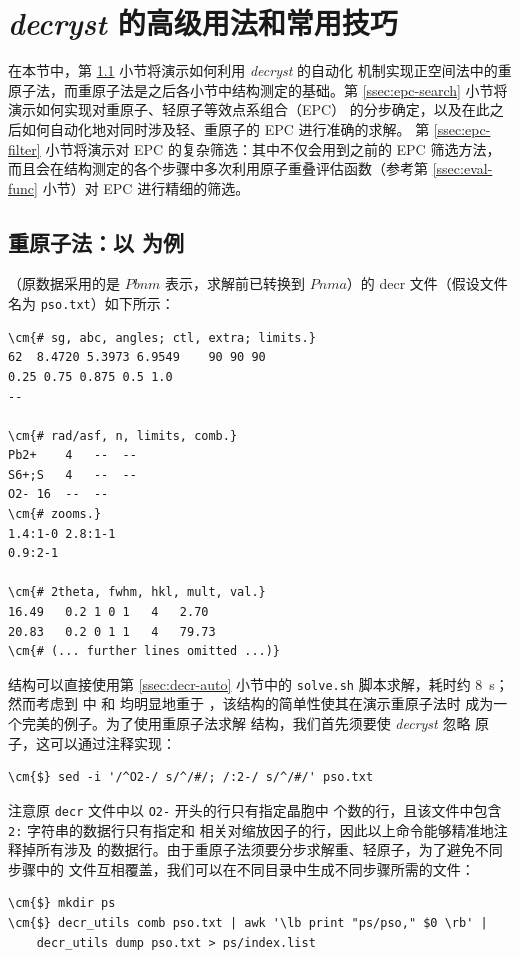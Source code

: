\section{\emph{decryst} 的高级用法和常用技巧}\label{sec:decr-adv}

在本节中，第 \ref{ssec:heavy-atom} 小节将演示如何利用 \emph{decryst} 的自动化
机制实现正空间法中的重原子法，而重原子法是之后各小节中结构测定的基础。第
\ref{ssec:epc-search} 小节将演示如何实现对重原子、轻原子等效点系组合（EPC）
的分步确定，以及在此之后如何自动化地对同时涉及轻、重原子的 EPC 进行准确的求解。
第 \ref{ssec:epc-filter} 小节将演示对 EPC 的复杂筛选：其中不仅会用到之前的
EPC 筛选方法，而且会在结构测定的各个步骤中多次利用原子重叠评估函数（参考第
\ref{ssec:eval-func} 小节）对 EPC 进行精细的筛选。

\subsection{重原子法：以  为例}\label{ssec:heavy-atom}

（原数据采用的是 $Pbnm$ 表示，求解前已转换到 $Pnma$）的
decr 文件（假设文件名为 \verb|pso.txt|）如下所示：
\begin{Verbatim}
\cm{# sg, abc, angles; ctl, extra; limits.}
62	8.4720 5.3973 6.9549	90 90 90
0.25 0.75 0.875	0.5 1.0
--

\cm{# rad/asf, n, limits, comb.}
Pb2+	4	--	--
S6+;S	4	--	--
O2-	16	--	--
\cm{# zooms.}
1.4:1-0	2.8:1-1
0.9:2-1

\cm{# 2theta, fwhm, hkl, mult, val.}
16.49	0.2	1 0 1	4	2.70
20.83	0.2	0 1 1	4	79.73
\cm{# (... further lines omitted ...)}
\end{Verbatim}

 结构可以直接使用第 \ref{ssec:decr-auto} 小节中的 \verb|solve.sh|
脚本求解，耗时约 \SI{8}{\second}；然而考虑到  中  和
 均明显地重于 ，该结构的简单性使其在演示重原子法时
成为一个完美的例子。为了使用重原子法求解  结构，我们首先须要使
\emph{decryst} 忽略  原子，这可以通过注释实现：
\begin{Verbatim}
\cm{$} sed -i '/^O2-/ s/^/#/; /:2-/ s/^/#/' pso.txt
\end{Verbatim}
注意原 \verb|decr| 文件中以 \verb|O2-| 开头的行只有指定晶胞中 
个数的行，且该文件中包含 \verb|2:| 字符串的数据行只有指定和 
相关对缩放因子的行，因此以上命令能够精准地注释掉所有涉及 
的数据行。由于重原子法须要分步求解重、轻原子，为了避免不同步骤中的
文件互相覆盖，我们可以在不同目录中生成不同步骤所需的文件：
\begin{Verbatim}
\cm{$} mkdir ps
\cm{$} decr_utils comb pso.txt | awk '\lb print "ps/pso," $0 \rb' |
	decr_utils dump pso.txt > ps/index.list
\end{Verbatim}

